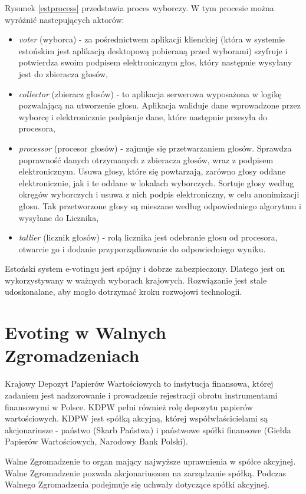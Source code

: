 \documentclass[a4paper,12pt]{book}
\begin{document}
Rysunek \ref{estprocess} przedstawia proces wyborczy. W tym procesie można wyróżnić nastepujących aktorów:
\begin{itemize}
\item \textit{voter} (wyborca) - za pośrednictwem aplikacji klienckiej (która w systemie estońskim jest aplikacją desktopową pobieraną przed wyborami) szyfruje i~ potwierdza swoim podpisem elektronicznym głos, który następnie wysyłany jest do zbieracza głosów,
\item \textit{collector} (zbieracz głosów) - to aplikacja serwerowa wyposażona w logikę pozwalającą na utworzenie głosu. Aplikacja waliduje dane wprowadzone przez wyborcę i elektronicznie podpisuje dane, które następnie przesyła do procesora,
\item \textit{processor} (procesor głosów) - zajmuje się przetwarzaniem głosów. Sprawdza poprawność danych otrzymanych z zbieracza głosów, wraz z podpisem elektronicznym. Usuwa głosy, które się powtarzają, zarówno głosy oddane elektronicznie, jak i te oddane w lokalach wyborczych. Sortuje głosy według okręgów wyborczych i usuwa z nich podpis elektroniczny, w celu anonimizacji głosu. Tak przetworzone głosy są mieszane według odpowiedniego algorytmu i wysyłane do Licznika,
\item \textit{tallier} (licznik głosów) - rolą licznika jest odebranie głosu od procesora, otwarcie go i dodanie przyporządkowanie do odpowiedniego wyniku.
\end{itemize}

Estoński system e-votingu jest spójny i dobrze zabezpieczony. Dlatego jest on wykorzystywany w ważnych wyborach krajowych. Rozwiązanie jest stale udoskonalane, aby mogło dotrzymać kroku rozwojowi technologii.\cite{estonian:voting}

\section{Evoting w Walnych Zgromadzeniach}

Krajowy Depozyt Papierów Wartościowych to instytucja finansowa, której zadaniem jest nadzorowanie i prowadzenie rejestracji obrotu instrumentami finansowymi w Polsce. KDPW pełni również rolę depozytu papierów wartościowych. KDPW jest spółką akcyjną, której współwłaścicielami są akcjonariusze - państwo (Skarb Państwa) i państwowe spółki finansowe (Giełda Papierów Wartościowych, Narodowy Bank Polski).

Walne Zgromadzenie to organ mający najwyższe uprawnienia w spółce akcyjnej. Walne Zgromadzenie pozwala akcjonariuszom na zarządzanie spółką. Podczas Walnego Zgromadzenia podejmuje się uchwały dotyczące spółki akcyjnej.
\end{document}
